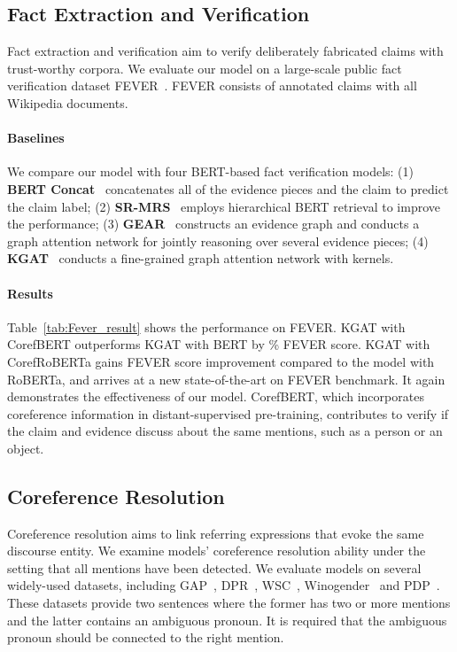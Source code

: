 \documentclass[11pt,a4paper]{article}
\newcommand\BASESIZE{\xspace}
\newcommand\LARGESIZE{\xspace}
\begin{document}
\subsection{Fact Extraction and Verification}
Fact extraction and verification aim to verify deliberately fabricated claims with trust-worthy corpora. We evaluate our model  on a large-scale public fact verification dataset FEVER~\citep{Fever}. FEVER consists of  annotated claims with all Wikipedia documents.

\vspace{-0.1em}
\paragraph{Baselines}
We compare our model with four BERT-based fact verification models: (1) \textbf{BERT Concat}~\citep{Zhoujie} concatenates all of the evidence pieces and the claim to predict the claim label; (2) \textbf{SR-MRS}~\citep{SR-MRS} employs hierarchical BERT retrieval to improve the performance; (3) \textbf{GEAR}~\citep{Zhoujie} constructs an evidence graph and conducts a graph attention network for jointly reasoning over several evidence pieces; (4) \textbf{KGAT}~\citep{Zhenghao}  conducts a fine-grained graph attention network with kernels.

\vspace{-0.1em}
\paragraph{Results}
Table~\ref{tab:Fever_result} shows the performance on FEVER. KGAT with CorefBERT\BASESIZE outperforms KGAT with BERT\BASESIZE by \% FEVER score. KGAT with CorefRoBERTa\LARGESIZE gains  FEVER score improvement compared to the model with RoBERTa\LARGESIZE, and arrives at a new state-of-the-art on FEVER benchmark. It again demonstrates the effectiveness of our model. CorefBERT, which incorporates coreference information in distant-supervised pre-training, contributes to verify if the claim and evidence discuss about the same mentions, such as a person or an object. 

 







\subsection{Coreference Resolution}

Coreference resolution aims to link referring expressions that evoke the same discourse entity. We examine models'  coreference resolution ability under the setting that all mentions have been detected. We evaluate models on several widely-used datasets, including GAP~\citep{GAP},  DPR~\citep{DPR}, WSC~\citep{WSC},  Winogender~\citep{Winogender} and PDP~\citep{PDP}.  
These datasets provide two sentences where the former has two or more mentions and the latter contains an ambiguous pronoun. It is required that the ambiguous pronoun should be connected to the right mention.
\end{document}
